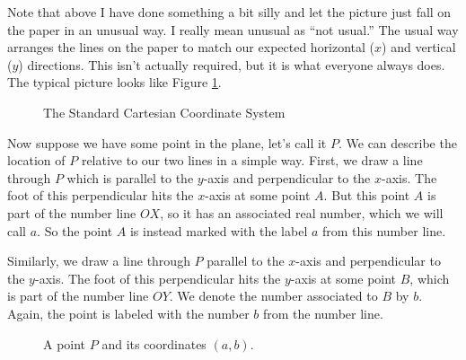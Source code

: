 \documentclass[elementsmain.tex]{subfiles}
\begin{document}
\begin{figure}[h!]
\centering
{}
\end{figure}

Note that above I have done something a bit silly and let the picture just fall on the paper in an unusual way.
I really mean unusual as ``not usual.''
The usual way arranges the lines on the paper to match our expected horizontal ($x$) and vertical ($y$) directions.
This isn't actually required, but it is what everyone always does.
The typical picture looks like Figure \ref{fig:cartesian-coords}.


\begin{figure}[h]
\centering
{}
\caption{The Standard Cartesian Coordinate System}
\label{fig:cartesian-coords}
\end{figure}


Now suppose we have some point in the plane, let's call it $P$.
We can describe the location of $P$ relative to our two lines in a simple way. First, we draw a line through $P$ which is parallel to the $y$-axis and perpendicular to the $x$-axis.
The foot of this perpendicular hits the $x$-axis at some point $A$.
But this point $A$ is part of the number line $OX$, so it has an associated real number, which we will call $a$.
So the point $A$ is instead marked with the label $a$ from this number line.

Similarly, we draw a line through $P$ parallel to the $x$-axis and perpendicular to the $y$-axis.
The foot of this perpendicular hits the $y$-axis at some point $B$, which is part of the number line $OY$.
We denote the number associated to $B$ by $b$.
Again, the point is labeled with the number $b$ from the number line.

\begin{figure}[h!]
\centering
{}
\caption{A point $P$ and its coordinates $(a,b)$.}
\label{fig:point-coords}
\end{figure}
\end{document}
